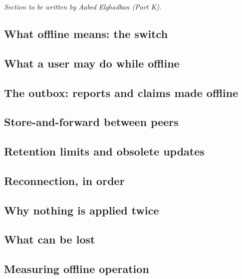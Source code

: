 \tbd{} \emph{Section to be written by Aabed Elghadban (Part K).}

\subsection{What offline means: the switch}

\subsection{What a user may do while offline}

\subsection{The outbox: reports and claims made offline}

\subsection{Store-and-forward between peers}

\subsection{Retention limits and obsolete updates}

\subsection{Reconnection, in order}

\subsection{Why nothing is applied twice}

\subsection{What can be lost}

\subsection{Measuring offline operation}

